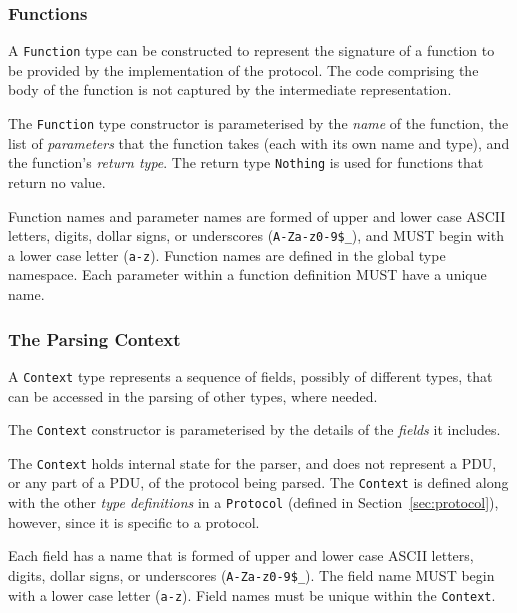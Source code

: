 \documentclass[10pt,twocolumn,a4paper]{article}
\newcommand{\code}[1]{\texttt{#1}}
\begin{document}
\subsubsection{Functions}
\label{sec:functions}

A \code{Function} type can be constructed to represent
the signature of a function to be provided by the implementation of
the protocol. The code comprising the body of the function is not captured by
the intermediate representation.

The \code{Function} type constructor is parameterised by the \emph{name} of
the function, the list of \emph{parameters} that the function takes (each
with its own name and type), and the function's \emph{return type}.
The return type \code{Nothing} is used for functions that return no value.

Function names and parameter names are formed of upper and lower case ASCII
letters, digits, dollar signs, or underscores (\code{A-Za-z0-9\$\_}), and
MUST begin with a lower case letter (\code{a-z}).
Function names are defined in the global type namespace.
Each parameter within a function definition MUST have a unique name.

\subsubsection{The Parsing Context}
\label{sec:context}

A \code{Context} type
represents a sequence of fields, possibly of different types, that can be
accessed in the parsing of other types, where needed.

The \code{Context}
constructor is parameterised by the details of the \emph{fields} it includes.

The \code{Context} holds internal state for the parser, and does not
represent a PDU, or any part of a PDU, of the protocol being parsed.
The \code{Context} is defined along with the other \emph{type definitions}
in a \code{Protocol} (defined in Section~\ref{sec:protocol}), however, since it
is specific to a protocol.

Each field has a name that is formed of upper and lower case ASCII letters,
digits, dollar signs, or underscores (\code{A-Za-z0-9\$\_}). The field name
MUST begin with a lower case letter (\code{a-z}). Field names must be unique
within the \code{Context}.
\end{document}
